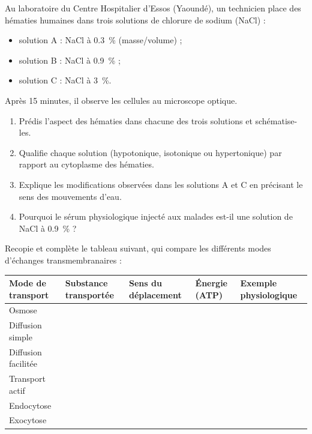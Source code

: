 \documentclass[11pt]{article}
\begin{document}
\begin{exercice}
Au laboratoire du Centre Hospitalier d'Essos (Yaoundé), un technicien place des hématies humaines dans trois solutions de chlorure de sodium (NaCl) :
\begin{itemize}
\item solution A : NaCl à \num{0,3}~\% (masse/volume) ;
\item solution B : NaCl à \num{0,9}~\% ;
\item solution C : NaCl à \num{3}~\%.
\end{itemize}
Après 15 minutes, il observe les cellules au microscope optique.
\begin{enumerate}
\item Prédis l'aspect des hématies dans chacune des trois solutions et schématise-les.
\item Qualifie chaque solution (hypotonique, isotonique ou hypertonique) par rapport au cytoplasme des hématies.
\item Explique les modifications observées dans les solutions A et C en précisant le sens des mouvements d'eau.
\item Pourquoi le sérum physiologique injecté aux malades est-il une solution de NaCl à \num{0,9}~\% ?
\end{enumerate}
\end{exercice}

\begin{exercice}
Recopie et complète le tableau suivant, qui compare les différents modes d'échanges transmembranaires :
\begin{center}
\begin{tabularx}{\linewidth}{|l|X|X|X|X|}
\hline
\rowcolor{popblueL} \textbf{Mode de transport} & \textbf{Substance transportée} & \textbf{Sens du déplacement} & \textbf{Énergie (ATP)} & \textbf{Exemple physiologique} \\
\hline
Osmose & & & & \\
\hline
Diffusion simple & & & & \\
\hline
Diffusion facilitée & & & & \\
\hline
Transport actif & & & & \\
\hline
Endocytose & & & & \\
\hline
Exocytose & & & & \\
\hline
\end{tabularx}
\end{center}
\end{exercice}
\end{document}
